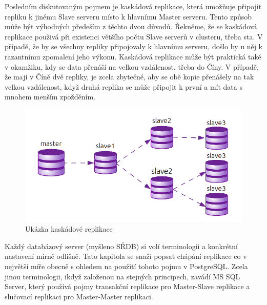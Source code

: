 Posledním diskutovaným pojmem je kaskádová replikace, která umožňuje připojit repliku k jinému Slave serveru místo k hlavnímu Master serveru. Tento způsob může být výhodných předeším z těchto dvou důvodů. Řekněme, že se kaskádová replikace použivá při existenci většího počtu Slave serverů v clusteru, třeba sta. V případě, že by se všechny repliky připojovaly k hlavnímu serveru, došlo by u něj k razantnímu zpomalení jeho výkonu. Kaskádová replikace může být praktická také v okamžiku, kdy se data přenáší na velkou vzdálenost, třeba do Číny. V případě, že mají v Číně dvě repliky, je zcela zbytečné, aby se obě kopie přenášely na tak velkou vzdálenost, když druhá replika se může připojit k první a mít data s mnohem menším zpožděním.

          \begin{figure}[H]
            \centering
            \includegraphics[scale=1]{../../../grafy/obr/schema_kaskadova.png}
            \caption{Ukázka kaskádové replikace}
            \label{kaskadova}
          \end{figure}

Každý databázový server (myšleno SŘDB) si volí terminologii a konkrétní nastavení mírně odlišně. Tato kapitola se snaží popsat chápání replikace co v největší míře obecně s ohledem na použití tohoto pojmu v PostgreSQL. Zcela jinou terminologii, ikdyž založenou na stejných principech, zavádí MS SQL Server, který používá pojmy transakční replikace pro Master-Slave replikace a slučovací replikaci pro Master-Master replikaci. 



